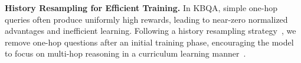 \documentclass[10pt,conference]{IEEEtran}
\begin{document}
\textbf{History Resampling for Efficient Training.}
In KBQA, simple one-hop queries often produce uniformly high rewards, leading to near-zero normalized advantages and inefficient learning. Following a history resampling strategy~\cite{zhang2025srpo}, we remove one-hop questions after an initial training phase, encouraging the model to focus on multi-hop reasoning in a curriculum learning manner~\cite{narvekar2020curriculum}.


\end{document}
